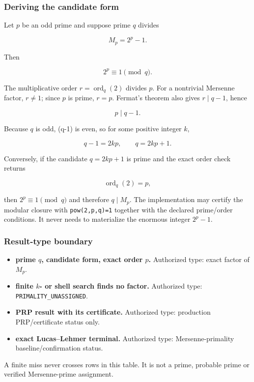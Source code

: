 \subsubsection{Deriving the candidate
form}\label{viii-ch10-deriving-the-candidate-form}

Let \(p\) be an odd prime and suppose prime \(q\) divides

\[
M_p=2^p-1.
\]

Then

\[
2^p\equiv1\pmod q.
\]

The multiplicative order \(r=\operatorname{ord}_q(2)\) divides \(p\).
For a nontrivial Mersenne factor, \(r\ne1\); since \(p\) is prime,
\(r=p\). Fermat's theorem also gives \(r\mid q-1\), hence

\[
p\mid q-1.
\]

Because \(q\) is odd, (q-1) is even, so for some positive integer \(k\),

\[
q-1=2kp,
\qquad
q=2kp+1.
\]

Conversely, if the candidate \(q=2kp+1\) is prime and the exact order
check returns

\[
\operatorname{ord}_q(2)=p,
\]

then \(2^p\equiv1\pmod q\) and therefore \(q\mid M_p\). The
implementation may certify the modular closure with
\texttt{pow(2,p,q)=1} together with the declared prime/order conditions.
It never needs to materialize the enormous integer \(2^p-1\).

\subsubsection{Result-type boundary}\label{viii-ch10-result-type-boundary}

\begin{itemize}
\tightlist
\item
  \textbf{prime \(q\), candidate form, exact order \(p\).} Authorized
  type: exact factor of \(M_p\).
\item
  \textbf{finite \(k\)- or shell search finds no factor.} Authorized
  type: \texttt{PRIMALITY\_UNASSIGNED}.
\item
  \textbf{PRP result with its certificate.} Authorized type: production
  PRP/certificate status only.
\item
  \textbf{exact Lucas--Lehmer terminal.} Authorized type:
  Mersenne-primality baseline/confirmation status.
\end{itemize}

A finite miss never crosses rows in this table. It is not a prime,
probable prime or verified Mersenne-prime assignment.

